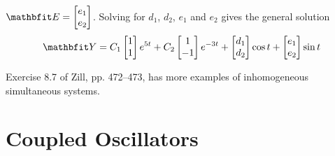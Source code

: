 \begin{example}
$\vect{E}=\begin{bmatrix}e_1\\e_2\end{bmatrix}$.  Solving for $d_1$, $d_2$,
$e_1$ and $e_2$ gives the general solution
$$\vect{Y}=C_1\begin{bmatrix}1\\1\end{bmatrix}e^{5t}+
C_2\begin{bmatrix}1\\-1\end{bmatrix}e^{-3t}+
\begin{bmatrix}d_1\\d_2\end{bmatrix}\cos t+
\begin{bmatrix}e_1\\e_2\end{bmatrix}\sin t$$
\end{example}

\begin{exercise}
Exercise 8.7 of Zill, pp. 472--473, has more examples of inhomogeneous 
simultaneous systems.
\end{exercise}

\section{Coupled Oscillators}

